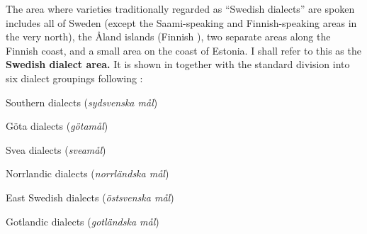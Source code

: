The area where varieties traditionally regarded as “Swedish dialects” are spoken includes all of Sweden (except the Saami-speaking and Finnish-speaking areas in the very north), the Åland islands (Finnish ), two separate areas along the Finnish coast, and a small area on the coast of Estonia. I shall refer to this as the \textbf{Swedish dialect area.} It is shown in together with the standard division into six dialect groupings following \citet[II:170]{Wessén1966}: 

\item 

Southern dialects (\textit{sydsvenska mål})


\item 

Göta dialects (\textit{götamål})


\item 

Svea dialects (\textit{sveamål})


\item 

Norrlandic dialects (\textit{norrländska mål})


\item 

East Swedish dialects (\textit{östsvenska mål})


\item 

Gotlandic dialects (\textit{gotländska mål})


